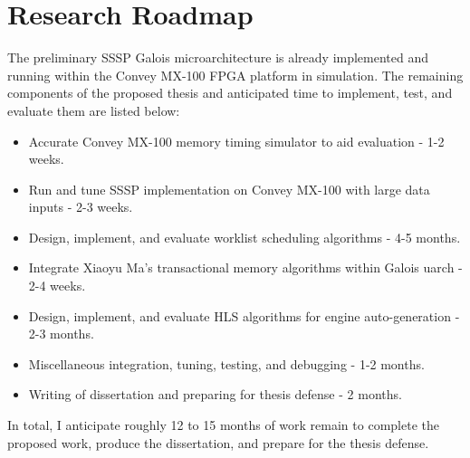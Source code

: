 \section{Research Roadmap}\label{sect:roadmap}

The preliminary SSSP Galois microarchitecture is already implemented and running within the Convey MX-100 FPGA platform 
in simulation. The remaining components of the proposed thesis and anticipated time to implement, test, and evaluate 
them are listed below:

\begin{itemize}
\item Accurate Convey MX-100 memory timing simulator to aid evaluation - 1-2 weeks.
\item Run and tune SSSP implementation on Convey MX-100 with large data inputs - 2-3 weeks.
\item Design, implement, and evaluate worklist scheduling algorithms - 4-5 months.
\item Integrate Xiaoyu Ma's transactional memory algorithms within Galois uarch - 2-4 weeks.
\item Design, implement, and evaluate HLS algorithms for engine auto-generation - 2-3 months.
\item Miscellaneous integration, tuning, testing, and debugging - 1-2 months.
\item Writing of dissertation and preparing for thesis defense - 2 months.
\end{itemize}

In total, I anticipate roughly 12 to 15 months of work remain to complete the proposed work, 
produce the dissertation, and prepare for the thesis defense.

